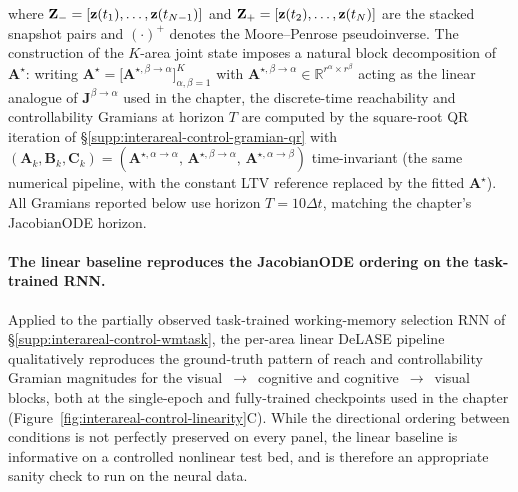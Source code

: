 where $\mathbf{Z}_{-}=[\vb{z}(t_{1}),\ldots,\vb{z}(t_{N-1})]$ and $\mathbf{Z}_{+}=[\vb{z}(t_{2}),\ldots,\vb{z}(t_{N})]$ are the stacked snapshot pairs and $(\cdot)^{+}$ denotes the Moore--Penrose pseudoinverse. The construction of the $K$-area joint state imposes a natural block decomposition of $\mathbf{A}^{\star}$: writing $\mathbf{A}^{\star}=\bigl[\mathbf{A}^{\star,\beta\to\alpha}\bigr]_{\alpha,\beta=1}^{K}$ with $\mathbf{A}^{\star,\beta\to\alpha}\in\mathbb{R}^{r^{\alpha}\times r^{\beta}}$ acting as the linear analogue of $\mathbf{J}^{\beta\to\alpha}$ used in the chapter, the discrete-time reachability and controllability Gramians at horizon $T$ are computed by the square-root QR iteration of \S\ref{supp:interareal-control-gramian-qr} with $(\mathbf{A}_{k},\mathbf{B}_{k},\mathbf{C}_{k})=(\mathbf{A}^{\star,\alpha\to\alpha},\,\mathbf{A}^{\star,\beta\to\alpha},\,\mathbf{A}^{\star,\alpha\to\beta})$ time-invariant (the same numerical pipeline, with the constant LTV reference replaced by the fitted $\mathbf{A}^{\star}$). All Gramians reported below use horizon $T=10\Delta t$, matching the chapter's JacobianODE horizon.

\paragraph{The linear baseline reproduces the JacobianODE ordering on the task-trained RNN.}
Applied to the partially observed task-trained working-memory selection RNN of \S\ref{supp:interareal-control-wmtask}, the per-area linear DeLASE pipeline qualitatively reproduces the ground-truth pattern of reach and controllability Gramian magnitudes for the visual~$\to$~cognitive and cognitive~$\to$~visual blocks, both at the single-epoch and fully-trained checkpoints used in the chapter (Figure~\ref{fig:interareal-control-linearity}C). While the directional ordering between conditions is not perfectly preserved on every panel, the linear baseline is informative on a controlled nonlinear test bed, and is therefore an appropriate sanity check to run on the neural data.

